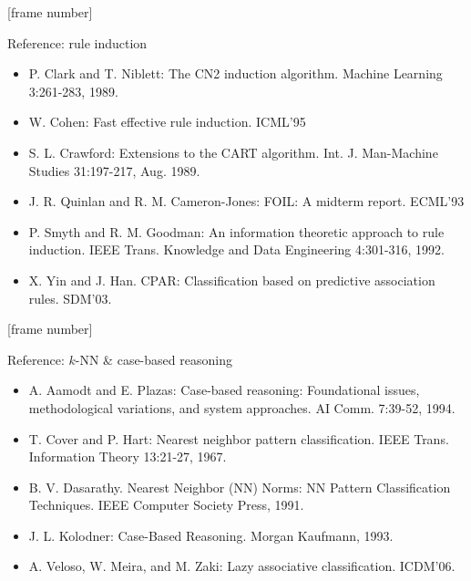 \documentclass[aspectratio=169,t,table]{beamer}
\begin{document}
  {
    [frame number]
    \begin{frame}{Reference: rule induction}
      \begin{itemize}
        \item P. Clark and T. Niblett: The CN2 induction algorithm. Machine Learning 3:261-283, 1989.
        \item W. Cohen: Fast effective rule induction. ICML'95
        \item S. L. Crawford: Extensions to the CART algorithm. Int. J. Man-Machine Studies 31:197-217, Aug. 1989.
        \item J. R. Quinlan and R. M. Cameron-Jones: FOIL: A midterm report. ECML'93
        \item P. Smyth and R. M. Goodman: An information theoretic approach to rule induction. IEEE Trans. Knowledge and Data Engineering 4:301-316, 1992.
        \item X. Yin and J. Han. CPAR: Classification based on predictive association rules. SDM'03.
      \end{itemize}
    \end{frame}
  }

  {
    [frame number]
    \begin{frame}{Reference: $k$-NN \& case-based reasoning}
      \begin{itemize}
        \item A. Aamodt and E. Plazas: Case-based reasoning: Foundational issues, methodological variations, and system approaches. AI Comm. 7:39-52, 1994.
        \item T. Cover and P. Hart: Nearest neighbor pattern classification. IEEE Trans. Information Theory 13:21-27, 1967.
        \item B. V. Dasarathy. Nearest Neighbor (NN) Norms: NN Pattern Classification Techniques. IEEE Computer Society Press, 1991.
        \item J. L. Kolodner: Case-Based Reasoning. Morgan Kaufmann, 1993.
        \item A. Veloso, W. Meira, and M. Zaki: Lazy associative classification. ICDM'06.
      \end{itemize}
    \end{frame}
  }
\end{document}
